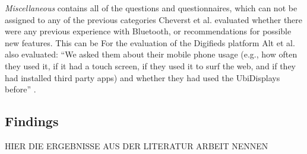 		\textit{Miscellaneous} contains all of the questions and questionnaires, which can not be assigned to any of the previous categories 
		Cheverst et al. \cite{cheverst2005hermes} evaluated whether there were any previous experience with Bluetooth, or recommendations for possible new features. This can be 
		For the evaluation of the Digifieds platform Alt et al. also evaluated: ``We asked them about their mobile phone usage (e.g., how often they used it, if it had a touch screen, if they used it to surf the web, and if they had installed third party apps) and whether they had used the UbiDisplays before'' \cite{alt2011digifieds}.









\subsection{Findings}
\label{section:questionnaires:findings}

	HIER DIE ERGEBNISSE AUS DER LITERATUR ARBEIT NENNEN





